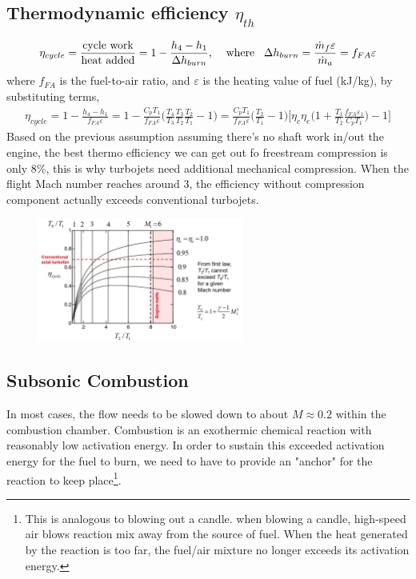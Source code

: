 \documentclass[a4paper,10pt]{article}
\begin{document}
\subsection{Thermodynamic efficiency $\eta_{th}$}
\begin{gather*}
    \eta_{cycle} = \frac{\text{cycle work}}{\text{heat added}} = 1-\frac{h_4-h_1}{\Delta h_{burn}},\hspace*{0.4cm}\text{where}\hspace*{0.3cm}\Delta h_{burn} = \frac{\dot{m}_f \varepsilon}{\dot{m}_a} = f_{FA}\varepsilon
\end{gather*}
where $f_{FA}$ is the fuel-to-air ratio, and $\varepsilon$ is the heating value of fuel (kJ/kg), by substituting terms,
\begin{gather*}
    \boxed{\eta_{cycle}} = 1-\frac{h_4-h_1}{f_{FA}\varepsilon} = 1-\frac{C_pT_1}{f_{FA}\varepsilon}\Bigg(\frac{T_4}{T_3}\frac{T_3}{T_2}\frac{T_2}{T_1}-1\Bigg) = \frac{C_pT_1}{f_{FA}\varepsilon}\Bigg(\frac{T_2}{T_1}-1\Bigg)\Bigg[\eta_c\eta_e\Bigg(1+\frac{T_1}{T_2}\frac{f_{FA}\varepsilon_1}{C_pT_1}\Bigg)-1\Bigg]
\end{gather*}
Based on the previous assumption assuming there's no shaft work in/out the engine, the best thermo efficiency we can get out fo freestream compression is only 8\%, this is why turbojets need additional mechanical compression. When the flight Mach number reaches around 3, the efficiency without compression component actually exceeds conventional turbojets. 

\begin{figure}[H]
    \centering
    \includegraphics[width=0.6\textwidth]{Figure/burner.png}
\end{figure}

\vspace*{-0.5cm}
\subsection{Subsonic Combustion}
In most cases, the flow needs to be slowed down to about $\boxed{M\approx0.2}$ within the combustion chamber. Combustion is an exothermic chemical reaction with reasonably low activation energy. In order to sustain this exceeded activation energy for the fuel to burn, we need to have  to provide an "anchor" for the reaction to keep place\footnote{This is analogous to blowing out a candle. when blowing a candle, high-speed air blows reaction mix away from the source of fuel. When the heat generated by the reaction is too far, the fuel/air mixture no longer exceeds its activation energy.}. 
\end{document}
